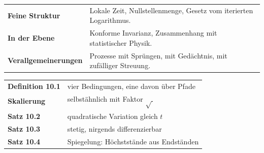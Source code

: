 \begin{forschung}
\begin{center}
{\small
\renewcommand{\arraystretch}{1.45}
\begin{tabular}{@{}P{3.0cm}P{5.2cm}@{}}
\toprule
\textbf{Feine Struktur} & Lokale Zeit, Nullstellenmenge, Gesetz vom iterierten Logarithmus.\\
\textbf{In der Ebene} & Konforme Invarianz, Zusammenhang mit statistischer Physik.\\
\textbf{Verallgemei\-nerungen} & Prozesse mit Sprüngen, mit Gedächtnis, mit zufälliger Streuung.\\
\bottomrule
\end{tabular}}
\end{center}

\begin{center}
\begin{minipage}{0.88\textwidth}
\end{minipage}
\end{center}
\end{forschung}

\begin{merksatz}
\begin{center}
\renewcommand{\arraystretch}{1.5}
\begin{tabular}{@{}P{3.0cm}P{5.6cm}@{}}
\toprule
\textbf{Definition 10.1} & vier Bedingungen, eine davon über Pfade\\
\textbf{Skalierung} & selbstähnlich mit Faktor $\sqrt{\ }$\\
\textbf{Satz 10.2} & quadratische Variation gleich $t$\\
\textbf{Satz 10.3} & stetig, nirgends differenzierbar\\
\textbf{Satz 10.4} & Spiegelung: Höchststände aus Endständen\\
\bottomrule
\end{tabular}
\end{center}

\begin{center}
\begin{minipage}{0.88\textwidth}
\end{minipage}
\end{center}
\end{merksatz}
